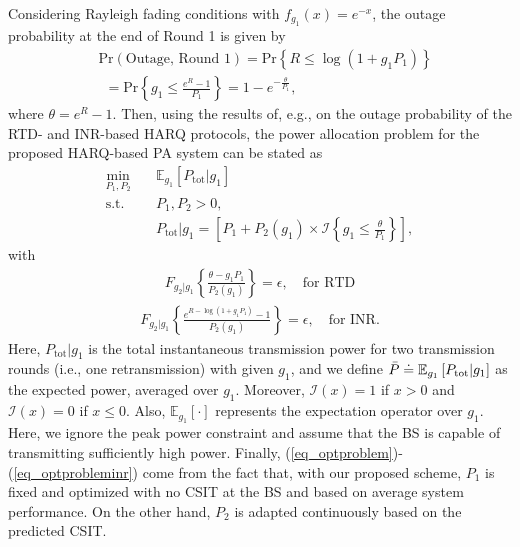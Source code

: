 Considering Rayleigh fading conditions with $f_{g_1}(x) =  e^{- x}$, the outage probability at the end of Round 1 is given by
\begin{align}\label{eq_pout}
&\text{Pr}(\text{Outage, Round 1}) = \text{Pr}\left\{R\leq \log(1+g_1P_1)\right\}\nonumber\\
&~~ = \text{Pr}\left\{g_1\leq \frac{e^{R}-1}{P_1}\right\}
 = 1-e^{ -\frac{\theta}{P_1}}, 
\end{align}
where $\theta = e^{R}-1$. Then, using the results of, e.g.,  \cite[Eq. 7, 18]{makki2014green} on the outage probability of the RTD- and INR-based HARQ protocols, the power allocation problem for the proposed HARQ-based PA system can be stated as
\begin{equation}
\label{eq_optproblem}
\begin{aligned}
\min_{P_1,P_2} \quad & \mathbb{E}_{g_1}\left[P_\text{tot}|g_1\right] \\
\textrm{s.t.} \quad &  P_1, P_2 > 0,\\
&P_\text{tot}|g_1 = \left[P_1 + P_2(g_1) \times \mathcal{I}\left\{g_1 \le \frac{\theta}{P_1}\right\}\right],
\end{aligned}
\end{equation}
with
\begin{align}\label{eq_optproblemrtd}
F_{g_2|g_1}\left\{\frac{\theta-g_1P_1}{P_2(g_1)}    \right\} = \epsilon, \quad\text{for RTD}
\end{align}
\begin{align}\label{eq_optprobleminr}
F_{g_2|g_1}\left\{\frac{e^{R-\log(1+g_1P_1)}-1}{P_2(g_1)}    \right\} = \epsilon, \quad\text{for INR}. 
\end{align}
Here, $P_\text{tot}|g_1$ is the total instantaneous transmission power for two transmission rounds (i.e., one retransmission) with given $g_1$, and we define $\Bar{P} \doteq \mathbb{E}_{g_1}\left[P_\text{tot}|g_1\right]$ as the expected power, averaged over $g_1$. Moreover, $\mathcal{I}(x)=1$ if $x>0$ and $\mathcal{I}(x)=0$ if $x \le 0$. Also, $\mathbb{E}_{g_1}[\cdot]$ represents the expectation operator over $g_1$. Here, we ignore the peak power constraint and assume that the BS is capable of transmitting  sufficiently high power. Finally, (\ref{eq_optproblem})-(\ref{eq_optprobleminr}) come from the fact that, with our proposed scheme, $P_1$ is fixed and optimized with no CSIT at the BS and based on average system performance. On the other hand, $P_2$ is adapted continuously based on the predicted CSIT.


